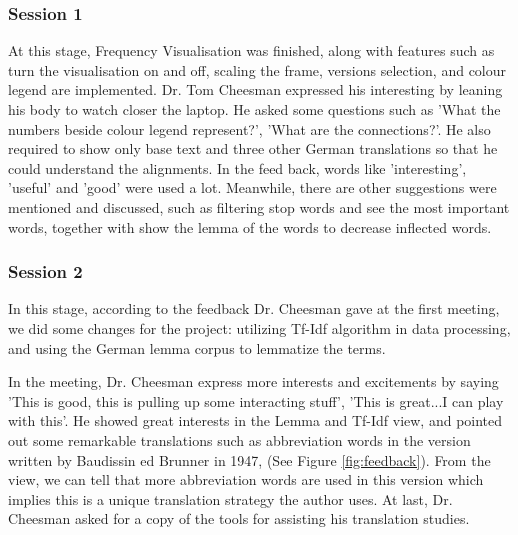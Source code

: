\subsubsection{Session 1}

At this stage, Frequency Visualisation was finished, along with features such as turn the visualisation on and off, scaling the frame, versions selection, and colour legend are implemented. Dr. Tom Cheesman expressed his interesting by leaning his body to watch closer the laptop. He asked some questions such as 'What the numbers beside colour legend represent?', 'What are the connections?'. He also required to show only base text and three other German translations so that he could understand the alignments. In the feed back, words like 'interesting', 'useful' and 'good' were used a lot. Meanwhile, there are other suggestions were mentioned and discussed, such as filtering stop words and see the most important words, together with show the lemma of the words to decrease inflected words.

\subsubsection{Session 2}

In this stage, according to the feedback Dr. Cheesman gave at the first meeting, we did some changes for the project: utilizing Tf-Idf algorithm in data processing, and using the German lemma corpus to lemmatize the terms. 

In the meeting, Dr. Cheesman express more interests and excitements by saying 'This is good, this is pulling up some interacting stuff', 'This is great...I can play with this'. He showed great interests in the Lemma and Tf-Idf view, and pointed out some remarkable translations such as abbreviation words in the version written by Baudissin ed Brunner in 1947, (See Figure \ref{fig:feedback}). From the view, we can tell that more abbreviation words are used in this version which implies this is a unique translation strategy the author uses. At last, Dr. Cheesman asked for a copy of the tools for assisting his translation studies.

